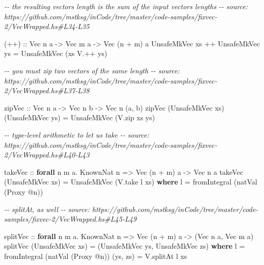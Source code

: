 \documentclass[]{article}
\newenvironment{Shaded}{}{}
\newcommand{\CommentTok}[1]{\textcolor[rgb]{0.38,0.63,0.69}{\textit{#1}}}
\newcommand{\DataTypeTok}[1]{\textcolor[rgb]{0.56,0.13,0.00}{#1}}
\newcommand{\FunctionTok}[1]{\textcolor[rgb]{0.02,0.16,0.49}{#1}}
\newcommand{\KeywordTok}[1]{\textcolor[rgb]{0.00,0.44,0.13}{\textbf{#1}}}
\newcommand{\NormalTok}[1]{#1}
\newcommand{\OperatorTok}[1]{\textcolor[rgb]{0.40,0.40,0.40}{#1}}
\newcommand{\OtherTok}[1]{\textcolor[rgb]{0.00,0.44,0.13}{#1}}
\begin{document}
\begin{Shaded}
\begin{Highlighting}[]
\CommentTok{{-}{-} the resulting vector\textquotesingle{}s length is the sum of the input vectors\textquotesingle{} lengths}
\CommentTok{{-}{-} source: https://github.com/mstksg/inCode/tree/master/code{-}samples/fixvec{-}2/VecWrapped.hs\#L34{-}L35}

\OtherTok{(++) ::} \DataTypeTok{Vec}\NormalTok{ n a }\OtherTok{{-}>} \DataTypeTok{Vec}\NormalTok{ m a }\OtherTok{{-}>} \DataTypeTok{Vec}\NormalTok{ (n }\OperatorTok{+}\NormalTok{ m) a}
\DataTypeTok{UnsafeMkVec}\NormalTok{ xs }\OperatorTok{++} \DataTypeTok{UnsafeMkVec}\NormalTok{ ys }\OtherTok{=} \DataTypeTok{UnsafeMkVec}\NormalTok{ (xs }\OperatorTok{V.++}\NormalTok{ ys)}

\CommentTok{{-}{-} you must zip two vectors of the same length}
\CommentTok{{-}{-} source: https://github.com/mstksg/inCode/tree/master/code{-}samples/fixvec{-}2/VecWrapped.hs\#L37{-}L38}

\OtherTok{zipVec ::} \DataTypeTok{Vec}\NormalTok{ n a }\OtherTok{{-}>} \DataTypeTok{Vec}\NormalTok{ n b }\OtherTok{{-}>} \DataTypeTok{Vec}\NormalTok{ n (a, b)}
\NormalTok{zipVec (}\DataTypeTok{UnsafeMkVec}\NormalTok{ xs) (}\DataTypeTok{UnsafeMkVec}\NormalTok{ ys) }\OtherTok{=} \DataTypeTok{UnsafeMkVec}\NormalTok{ (V.zip xs ys)}

\CommentTok{{-}{-} type{-}level arithmetic to let us \textquotesingle{}take\textquotesingle{}}
\CommentTok{{-}{-} source: https://github.com/mstksg/inCode/tree/master/code{-}samples/fixvec{-}2/VecWrapped.hs\#L40{-}L43}

\OtherTok{takeVec ::} \KeywordTok{forall}\NormalTok{ n m a}\OperatorTok{.} \DataTypeTok{KnownNat}\NormalTok{ n }\OtherTok{=>} \DataTypeTok{Vec}\NormalTok{ (n }\OperatorTok{+}\NormalTok{ m) a }\OtherTok{{-}>} \DataTypeTok{Vec}\NormalTok{ n a}
\NormalTok{takeVec (}\DataTypeTok{UnsafeMkVec}\NormalTok{ xs) }\OtherTok{=} \DataTypeTok{UnsafeMkVec}\NormalTok{ (V.take l xs)}
  \KeywordTok{where}
\NormalTok{    l }\OtherTok{=} \FunctionTok{fromIntegral}\NormalTok{ (natVal (}\DataTypeTok{Proxy} \OperatorTok{@}\NormalTok{n))}

\CommentTok{{-}{-} splitAt, as well}
\CommentTok{{-}{-} source: https://github.com/mstksg/inCode/tree/master/code{-}samples/fixvec{-}2/VecWrapped.hs\#L45{-}L49}

\OtherTok{splitVec ::} \KeywordTok{forall}\NormalTok{ n m a}\OperatorTok{.} \DataTypeTok{KnownNat}\NormalTok{ n }\OtherTok{=>} \DataTypeTok{Vec}\NormalTok{ (n }\OperatorTok{+}\NormalTok{ m) a }\OtherTok{{-}>}\NormalTok{ (}\DataTypeTok{Vec}\NormalTok{ n a, }\DataTypeTok{Vec}\NormalTok{ m a)}
\NormalTok{splitVec (}\DataTypeTok{UnsafeMkVec}\NormalTok{ xs) }\OtherTok{=}\NormalTok{ (}\DataTypeTok{UnsafeMkVec}\NormalTok{ ys, }\DataTypeTok{UnsafeMkVec}\NormalTok{ zs)}
  \KeywordTok{where}
\NormalTok{    l }\OtherTok{=} \FunctionTok{fromIntegral}\NormalTok{ (natVal (}\DataTypeTok{Proxy} \OperatorTok{@}\NormalTok{n))}
\NormalTok{    (ys, zs) }\OtherTok{=}\NormalTok{ V.splitAt l xs}
\end{Highlighting}
\end{Shaded}
\end{document}
